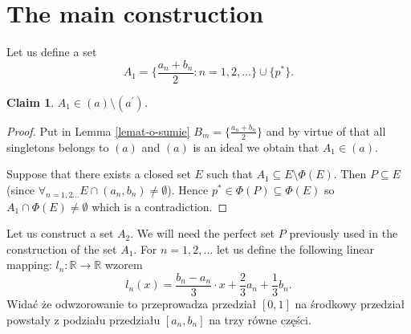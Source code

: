 \documentclass[12pt]{amsart}
\theoremstyle{plain}
\newtheorem{claim}[theorem]{Claim}
\theoremstyle{definition}
\theoremstyle{remark}
\newcommand{\real}{\mathbb{R}}
\newcommand{\aideal}{\mathit{(a)}}
\newcommand{\aidealprime}{\mathit{(a^\prime)}}
\begin{document}
\section{The main construction}

Let us define a set
\[ A_1 = \lbrace \frac{a_n + b_n}{2} \colon n = 1,2,\ldots\rbrace \cup \lbrace p^* \rbrace.
\]

\begin{claim}
  $A_1 \in \aideal \setminus \aidealprime$.
\end{claim}  
\begin{proof}
Put in Lemma \ref{lemat-o-sumie} 
$B_m = \lbrace \frac{a_n + b_n}{2} \rbrace$
and by virtue of that all singletons belongs to
$\aideal$ and $\aideal$
is an ideal we obtain that $A_1 \in \aideal$.

\smallskip

Suppose that there exists a closed set $E$ such that
$A_1 \subseteq E \setminus \Phi(E)$.
Then $P \subseteq E$
(since $\forall_{n=1,2\ldots} E \cap (a_n, b_n) \not= \emptyset$).
Hence $p^* \in \Phi(P) \subseteq \Phi(E)$ so $A_1 \cap \Phi(E) \not= \emptyset$
which is a contradiction.
\end{proof}

Let us construct a set $A_2$.
We will need the perfect set $P$
previously used in the construction of the set
$A_1$.
For $n = 1,2,\ldots$ let us define the following
linear mapping:
$l_n\colon \real\to\real$ wzorem
\[l_n(x) = \frac{b_n - a_n}{3} \cdot x + \frac{2}{3} a_n + \frac{1}{3} b_n.\]
Widać że odwzorowanie to przeprowadza przedział $[0,1]$ na
środkowy przedział powstały z podziału przedziału $[a_n, b_n]$ na trzy
równe części.
\end{document}
